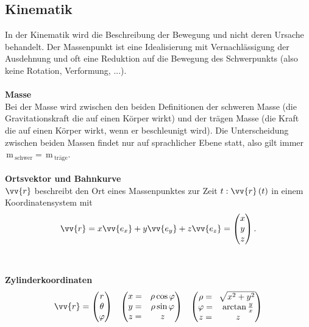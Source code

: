 \documentclass[a4paper,12pt]{article}
\begin{document}
\subsection{Kinematik}
In der Kinematik wird die Beschreibung der Bewegung und nicht deren Ursache behandelt. Der Massenpunkt ist eine Idealisierung mit Vernachlässigung der Ausdehnung und oft eine Reduktion auf die Bewegung des Schwerpunkts (also keine Rotation, Verformung, ...).
\\\hfill\\\textbf{Masse}\\ 
Bei der Masse wird zwischen den beiden Definitionen der schweren Masse (die Gravitationskraft die auf einen Körper wirkt) und der trägen Masse (die Kraft die auf einen Körper wirkt, wenn er beschleunigt wird). Die Unterscheidung zwischen beiden Massen findet nur auf sprachlicher Ebene statt, also gilt immer $\,\text{m}\,_{\text{schwer}}=\,\text{m}\,_{\text{träge}}$. 
\\\hfill\\\textbf{Ortsvektor und Bahnkurve}\\
$\vv{r}$ beschreibt den Ort eines Massenpunktes zur Zeit $t:\vv{r}\left(t\right)$ in einem Koordinatensystem mit
\[ 
        \vv{r}=x\vv{e_x}+y\vv{e_y}+z\vv{e_z}=\left(\begin{matrix}
                x\\y\\z
        \end{matrix}\right)
.\] 
\\\hfill\\\textbf{Zylinderkoordinaten}\\ 
\begin{align*}
        \vv{r}=\left(\begin{matrix}
                r\\\theta \\\varphi 
                \end{matrix}\right)&&\left(\begin{matrix}
                x=&\rho \cos \varphi\\
                y=&\rho \sin \varphi\\
                z=&z
                \end{matrix}\right)&&\left(\begin{matrix}
                \rho =&\sqrt[]{x^2+y^2}\\
                \varphi=&\arctan \tfrac{y}{x}\\
                z=&z
                \end{matrix}\right)
\end{align*}
\end{document}
